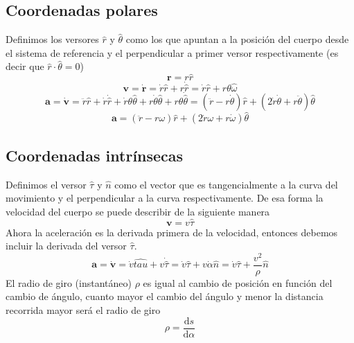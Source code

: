 \documentclass[a4paper]{article}
\numberwithin{equation}{section}
\begin{document}
    \subsection{Coordenadas polares}
        Definimos los versores $\hat{r}$ y $\hat{\theta}$ como los que apuntan a la posición del cuerpo desde el sistema de referencia y el perpendicular a primer versor respectivamente (es decir que $\hat{r} \cdot \hat{\theta} = 0$) 
        \begin{equation}
            \boldsymbol{r} = r \hat{r}
            \label{eq:r_pol}
        \end{equation}
        \begin{equation}
            \boldsymbol{v} = \dot{\boldsymbol{r}} = \dot{r} \hat{r} + r \dot{\hat{r}} = \dot{r} \hat{r} + r \theta \hat{\omega}
            \label{eq:v_pol}
        \end{equation}
        \begin{equation*}
            \boldsymbol{a} = \dot{\boldsymbol{v}} = \ddot{r} \hat{r} + \dot{r} \dot{\hat{r}} + \dot{r} \theta \hat{\theta} + r \dot{\theta} \hat{\theta} + r \theta \dot{\hat{\theta}} = (\ddot{r} - r \dot{\theta}) \hat{r} + (2 \dot{r} \dot{\theta} + r \ddot{\theta}) \hat{\theta}
        \end{equation*}
        \begin{equation}
            \boldsymbol{a} = (\ddot{r} - r \omega) \hat{r} + (2 \dot{r} \omega + r \dot{\omega}) \hat{\theta}
            \label{eq:a_pol}
        \end{equation}
        \subsection{Coordenadas intrínsecas}
            Definimos el versor $\hat{\tau}$ y $\hat{n}$ como el vector que es tangencialmente a la curva del movimiento y el perpendicular a la curva respectivamente. De esa forma la velocidad del cuerpo se puede describir de la siguiente manera
            \begin{equation}
                \boldsymbol{v} = v \hat{\tau}
                \label{eq:v_intrin}
            \end{equation}
            Ahora la aceleración es la derivada primera de la velocidad, entonces debemos incluir la derivada del versor $\hat{\tau}$. 
            \begin{equation}
                \boldsymbol{a} = \dot{\boldsymbol{v}} = \dot{v} \hat{tau} + v \dot{\hat{\tau}} = \dot{v} \hat{\tau} + v \dot{\alpha} \hat{n} = \dot{v} \hat{\tau} + \frac{v^{2}}{\rho} \hat{n}
                \label{eq:a_intrin}
            \end{equation}
            El radio de giro (instantáneo) $\rho$ es igual al cambio de posición en función del cambio de ángulo, cuanto mayor el cambio del ángulo y menor la distancia recorrida mayor será el radio de giro
            \begin{equation}
                \rho = \frac{\mathrm{d}s}{\mathrm{d}\alpha}
            \end{equation}
\end{document}

